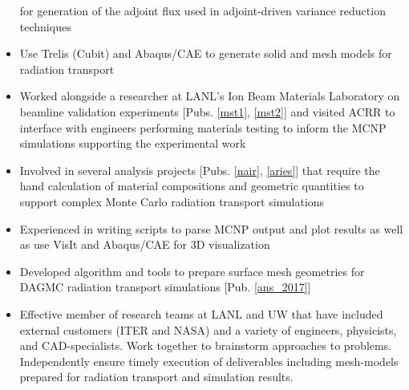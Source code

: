 \begin{center}
\begin{minipage}{\textwidth}
\begin{itemize}[leftmargin=.875in,rightmargin=.75in,itemsep=1.0mm]
                    for generation of the adjoint flux used in adjoint-driven 
                    variance reduction techniques
              \item Use Trelis (Cubit) and Abaqus/CAE to generate solid and 
                    mesh models for radiation transport %
		\item Worked alongside a researcher
			at LANL's Ion Beam Materials Laboratory
			on beamline validation experiments 
		        [Pubs. \ref{mst1}, \ref{mst2}]
                        and
			visited ACRR to interface with engineers performing
        			materials testing to inform the MCNP simulations
			supporting the experimental work
	       \item Involved in several analysis projects
		      [Pubs. \ref{nair}, \ref{aries}]	       
		     that require the hand calculation of material compositions
		     and geometric quantities to support complex Monte
		     Carlo radiation transport simulations
	       \item Experienced in writing scripts to parse MCNP output
	               and plot results as well as use VisIt and Abaqus/CAE for 3D visualization
               \item Developed algorithm and tools to 
		       prepare surface mesh geometries for DAGMC
		       radiation transport simulations [Pub. \ref{ans_2017}]
		\item Effective member of research teams at LANL and
		      UW that have included external customers (ITER and NASA) 
                      and a variety of engineers, physicists, and CAD-specialists.
                      Work together to brainstorm approaches to problems.
                      Independently
                      ensure timely execution of deliverables including
                      mesh-models prepared for radiation transport
                      and simulation results.

\end{itemize}
\end{minipage}
\end{center}
